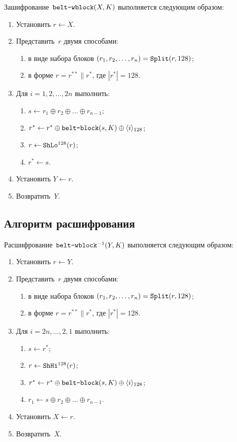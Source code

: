 Зашифрование~$\texttt{belt-wblock}(X,K)$ выполняется следующим образом:
\begin{enumerate}
\item
Установить
$r\leftarrow X$.
\item
Представить~$r$ двумя способами:
\begin{enumerate}
\item
в виде набора блоков $(r_1,r_2,\ldots,r_n)=\mathop{\texttt{Split}}\nolimits(r,128)$;
\item
в форме $r=r^{**}\parallel r^*$, где $|r^*|=128$.
\end{enumerate}
\item
Для $i=1,2,\ldots,2n$ выполнить:
\begin{enumerate}
\item
$s\leftarrow r_1\oplus r_2\oplus\ldots\oplus r_{n-1}$;

\item
$r^*\leftarrow r^*\oplus \texttt{belt-block}(s,K)\oplus
\langle i\rangle_{128}$;

\item
$r\leftarrow \mathop{\texttt{ShLo}}\nolimits^{128}(r)$;

\item
$r^*\leftarrow s$.
\end{enumerate}

\item
Установить
$Y\leftarrow r$.

\item
Возвратить~$Y$.
\end{enumerate}

\subsection{Алгоритм расшифрования}\label{WBLOCK.Decr}

Расшифрование~$\texttt{belt-wblock}^{-1}(Y,K)$ выполняется 
следующим образом: 
\begin{enumerate}
\item
Установить $r\leftarrow Y$.
\item
Представить~$r$ двумя способами:
\begin{enumerate}
\item
в виде набора блоков $(r_1,r_2,\ldots,r_n)=\mathop{\texttt{Split}}\nolimits(r,128)$;
\item
в форме $r=r^{**}\parallel r^*$, где $|r^*|=128$.
\end{enumerate}
\item
Для $i=2n,\ldots,2,1$ выполнить:
\begin{enumerate}
\item
$s\leftarrow r^*$;
\item
$r\leftarrow \mathop{\texttt{ShHi}}\nolimits^{128}(r)$;
\item
$r^*\leftarrow r^*\oplus \texttt{belt-block}(s,K)\oplus
\langle i\rangle_{128}$;
\item
$r_1\leftarrow s\oplus r_2\oplus\ldots\oplus r_{n-1}$.
\end{enumerate}
\item
Установить
$X\leftarrow r$.
\item
Возвратить~$X$.
\end{enumerate}
